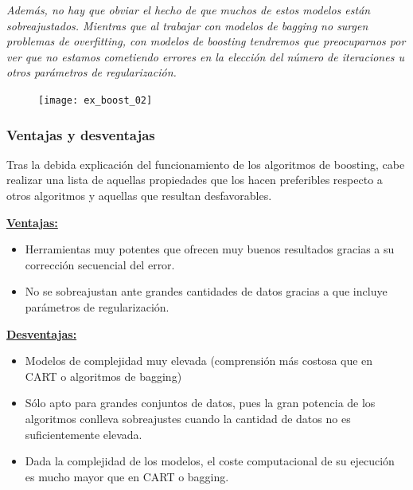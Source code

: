 \documentclass[12pt,twoside]{article}
\begin{document}
\textit{Además, no hay que obviar el hecho de que muchos de estos modelos están sobreajustados. Mientras que al trabajar con modelos de bagging no surgen problemas de overfitting, con modelos de boosting tendremos que preocuparnos por ver que no estamos cometiendo errores en la elección del número de iteraciones u otros parámetros de regularización.}

\begin{figure}[h]
\centering
\texttt{[image: ex\_boost\_02]}
\end{figure}







\subsubsection{Ventajas y desventajas}

Tras la debida explicación del funcionamiento de los algoritmos de boosting, cabe realizar una lista de aquellas propiedades que los hacen preferibles respecto a otros algoritmos y aquellas que resultan desfavorables.

\textbf{\underline{Ventajas:}}
\begin{itemize}
\item Herramientas muy potentes que ofrecen muy buenos resultados gracias a su corrección secuencial del error.

\item No se sobreajustan ante grandes cantidades de datos gracias a que incluye parámetros de regularización.
\end{itemize}

\textbf{\underline{Desventajas:}}
\begin{itemize}
\item Modelos de complejidad muy elevada (comprensión más costosa que en CART o algoritmos de bagging)

\item Sólo apto para grandes conjuntos de datos, pues la gran potencia de los algoritmos conlleva sobreajustes cuando la cantidad de datos no es suficientemente elevada.

\item Dada la complejidad de los modelos, el coste computacional de su ejecución es mucho mayor que en CART o bagging.
\end{itemize}
\end{document}

